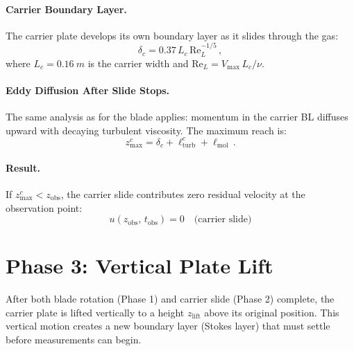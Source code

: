 \documentclass[11pt,a4paper]{article}
\begin{document}
\paragraph{Carrier Boundary Layer.}
The carrier plate develops its own boundary layer as it slides through
the gas:
\begin{equation}
  \delta_c = 0.37\,L_c\,\mathrm{Re}_L^{-1/5}\,,
\end{equation}
where $L_c = \SI{0.16}{m}$ is the carrier width and
$\mathrm{Re}_L = V_\mathrm{max}\,L_c/\nu$.

\paragraph{Eddy Diffusion After Slide Stops.}
The same analysis as for the blade applies: momentum in the carrier BL
diffuses upward with decaying turbulent viscosity. The maximum reach is:
\begin{equation}
  z_\mathrm{max}^c = \delta_c + \ell_\mathrm{turb}^c + \ell_\mathrm{mol}\,.
\end{equation}

\paragraph{Result.}
If $z_\mathrm{max}^c < z_\mathrm{obs}$, the carrier slide contributes
zero residual velocity at the observation point:
\begin{equation}
  \boxed{u(z_\mathrm{obs},\, t_\mathrm{obs}) = 0
    \quad \text{(carrier slide)}}
\end{equation}


\section{Phase 3: Vertical Plate Lift}
\label{sec:lift}

After both blade rotation (Phase 1) and carrier slide (Phase 2) complete,
the carrier plate is lifted vertically to a height $z_\mathrm{lift}$ above
its original position. This vertical motion creates a new boundary layer
(Stokes layer) that must settle before measurements can begin.
\end{document}
